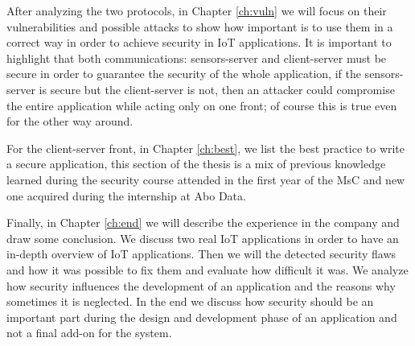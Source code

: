 	After analyzing the two protocols, in Chapter \ref{ch:vuln} we will focus on their vulnerabilities and possible attacks to show
	how important is to use them in a correct way in order to achieve security in IoT applications.\newline
	It is important to highlight that both communications: sensors-server and client-server must be secure in order to guarantee
	the security of the whole application, if the sensors-server is secure but the client-server is not, then an
	attacker could compromise the entire application while acting only on one front; of course this is true even for the other way around.\newline
	
	For the client-server front, in Chapter \ref{ch:best}, we list the best practice to write a secure application, this section of the thesis
	is a mix of previous knowledge learned during the security course attended in the first year of the MsC and new one
	acquired during the internship at Abo Data.\newline
	
	Finally, in Chapter \ref{ch:end} we will describe the experience in the company and draw some conclusion. We discuss two real IoT applications in order to have an in-depth overview of IoT applications.\newline
	Then we will the detected security flaws and how it was possible to fix them and evaluate how difficult it was.\newline
	We analyze how security influences the development of an application and the reasons why sometimes it is neglected.
	In the end we discuss how security should be an important part during the design and development phase of an application
	and not a final add-on for the system.\newline
	